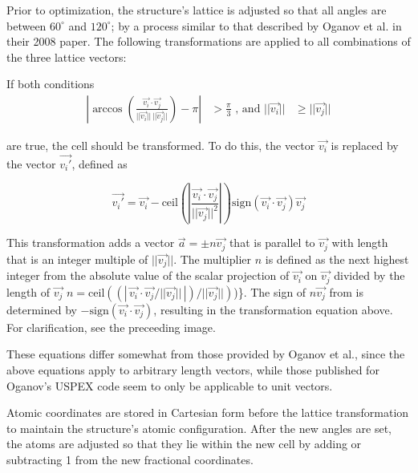  Prior to optimization, the structure's lattice is adjusted so that all angles are between $60^\circ$ and $120^\circ$; by a process similar to that described by Oganov et al. in their 2008 paper. The following transformations are applied to all combinations of the three lattice vectors\-:

If both conditions \begin{eqnarray} \left| \arccos\left(\frac{\vec{v_i}\cdot \vec{v_j}} {||\vec{v_i}||\,||\vec{v_j}||} \right) - \pi \right| &> \frac{\pi}{3} \mbox{\ ,\ and\ } ||\vec{v_i}|| &\geq ||\vec{v_j}|| \end{eqnarray}

are true, the cell should be transformed. To do this, the vector $\vec{v_i}$ is replaced by the vector $\vec{v_i'}$, defined as

\[ \vec{v_i'} = \vec{v_i} - \mbox{ceil}\left(\left|\frac{\vec{v_i}\cdot \vec{v_j}} {||\vec{v_j}||^2}\right|\right)\mbox{sign}(\vec{v_i}\cdot \vec{v_j})\vec{v_j} \]

This transformation adds a vector $\vec{a} = \pm n \vec{v_j}$ that is parallel to $\vec{v_j}$ with length that is an integer multiple of $||\vec{v_j}||$. The multiplier $n$ is defined as the next highest integer from the absolute value of the scalar projection of $\vec{v_i}$ on $\vec{v_j}$ divided by the length of $\vec{v_j}$ $n = \mbox{ceil}\left(\left(\left|\,\vec{v_i}\cdot \vec{v_j}/ ||\vec{v_j}||\,\right|\right)/||\vec{v_j}||\right)$)\}. The sign of $n\vec{v_j}$ from is determined by $-\mbox{sign}(\vec{v_i}\cdot\vec{v_j})$, resulting in the transformation equation above. For clarification, see the preceeding image.

These equations differ somewhat from those provided by Oganov et al., since the above equations apply to arbitrary length vectors, while those published for Oganov's U\-S\-P\-E\-X code seem to only be applicable to unit vectors.

Atomic coordinates are stored in Cartesian form before the lattice transformation to maintain the structure's atomic configuration. After the new angles are set, the atoms are adjusted so that they lie within the new cell by adding or subtracting 1 from the new fractional coordinates. 